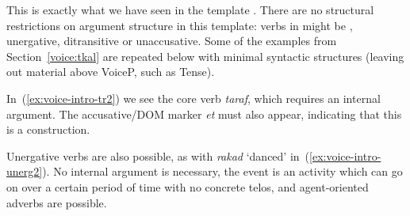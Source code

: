 \begin{exe}
\begin{xlist}
\begin{exe}
\begin{xlist}
\begin{exe}
\begin{xlist}
\begin{exe}
\begin{exe}
\begin{xlist}
\begin{exe}
\begin{xlist}
\begin{exe}
\begin{xlist}
\begin{exe}
\begin{xlist}
\begin{exe}
\begin{xlist}
\begin{exe}
\begin{xlist}
\begin{exe}
\begin{xlist}
\begin{exe}
\begin{xlist}
\begin{xlist}
\begin{exe}
\begin{xlist}
\begin{exe}
\begin{xlist}
\begin{exe}
\begin{xlist}
\begin{exe}
\begin{xlist}
This is exactly what we have seen in the template {\tkal}. There are no structural restrictions on argument structure in this template: verbs in {\tkal} might be , unergative, ditransitive or unaccusative. Some of the examples from Section~\ref{voice:tkal} are repeated below with minimal syntactic structures (leaving out material above VoiceP, such as Tense).

In~(\ref{ex:voice-intro-tr2}) we see the core  verb \emph{taraf}, which requires an internal argument. The accusative/DOM marker \emph{et} must also appear, indicating that this is a  construction.

 \begin{exe}
 \ex \label{ex:voice-intro-tr2} 
 \begin{xlist} 
	
 	 \z
\z\pagebreak

Unergative verbs are also possible, as with \emph{rakad} `danced' in~(\ref{ex:voice-intro-unerg2}). No internal argument is necessary, the event is an activity which can go on over a certain period of time with no concrete telos, and agent-oriented adverbs are possible.

 \begin{exe}
 \ex \label{ex:voice-intro-unerg2} 
 \begin{xlist} 
	
 	 \z
\z 


\end{xlist}
\end{exe}
\end{xlist}
\end{exe}
\end{xlist}
\end{exe}
\end{xlist}
\end{exe}
\end{xlist}
\end{exe}
\end{xlist}
\end{exe}
\end{xlist}
\end{xlist}
\end{exe}
\end{xlist}
\end{exe}
\end{xlist}
\end{exe}
\end{xlist}
\end{exe}
\end{xlist}
\end{exe}
\end{xlist}
\end{exe}
\end{xlist}
\end{exe}
\end{xlist}
\end{exe}
\end{exe}
\end{xlist}
\end{exe}
\end{xlist}
\end{exe}
\end{xlist}
\end{exe}
